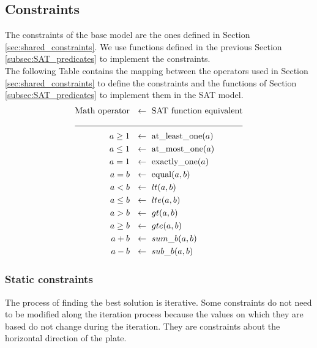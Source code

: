 


\subsection{Constraints}
  The constraints of the base model are the ones defined in Section \ref{sec:shared_constraints}.
  We use functions defined in the previous Section \ref{subsec:SAT_predicates} to implement
  the constraints.\\
  
  The following Table contains the mapping between the operators used in Section 
  \ref{sec:shared_constraints} to define the constraints and the functions of Section 
  \ref{subsec:SAT_predicates} to implement them in the SAT model.\\

  \begin{align*}
    \text{Math operator} \ &\ \leftarrow\ \text{SAT function equivalent}      \\
               \cline{1-2}
      a \geq 1 \ &\ \leftarrow\ \text{at\_least\_one}(a) \\
      a \leq 1 \ &\ \leftarrow\ \text{at\_most\_one}(a)  \\
         a = 1 \ &\ \leftarrow\ \text{exactly\_one}(a)   \\
         a = b \ &\ \leftarrow\ \text{equal}(a,b)        \\
         a < b \ &\ \leftarrow\ lt(a,b)                  \\
      a \leq b \ &\ \leftarrow\ lte(a,b)                 \\
         a > b \ &\ \leftarrow\ gt(a,b)                  \\
      a \geq b \ &\ \leftarrow\ gte(a,b)                 \\
         a + b \ &\ \leftarrow\ sum\_b(a,b)              \\   
         a - b \ &\ \leftarrow\ sub\_b(a,b)                 
  \end{align*}

  \subsubsection{Static constraints} \label{subsec:SAT_static_cons}
    The process of finding the best solution is iterative. Some constraints do not 
    need to be modified along the iteration process because the values on which they 
    are based do not change during the iteration. They are constraints about the horizontal 
    direction of the plate.\\

